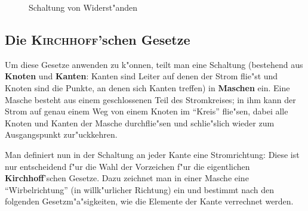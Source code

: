 \begin{figure}
   \centering
\hfill
{}
   \caption{Schaltung von Widerst"anden}
   \label{abb_schaltung_widerstaende}
\end{figure}












\subsection{Die \textsc{Kirchhoff}'schen Gesetze}
\label{kap_kirchhoffschen-gesetze}

Um diese Gesetze anwenden zu k"onnen, teilt man eine Schaltung
(bestehend aus \textbf{Knoten} und \textbf{Kanten}: Kanten sind Leiter
auf denen der Strom flie"st und Knoten sind die Punkte, an denen sich
Kanten treffen) in \textbf{Maschen} ein. Eine Masche
besteht aus einem geschlossenen Teil des Stromkreises; in ihm kann der
Strom auf genau einem Weg von einem Knoten im "`Kreis"' flie"sen,
dabei alle Knoten und Kanten der Masche durchflie"sen und schlie"slich
wieder zum Ausgangspunkt zur"uckkehren.

Man definiert nun in der Schaltung an jeder Kante eine
Stromrichtung: Diese ist nur entscheidend f"ur die Wahl der Vorzeichen
f"ur die eigentlichen \textbf{Kirchhoff}'schen Gesetze. Dazu zeichnet
man in einer Masche eine "`Wirbelrichtung"' (in willk"urlicher
Richtung) ein und bestimmt nach den folgenden Gesetzm"a"sigkeiten, wie
die Elemente der Kante verrechnet werden.



